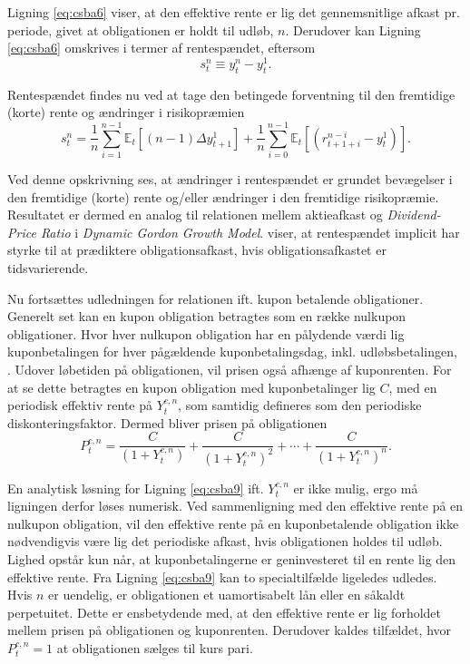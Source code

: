 \documentclass[
  a4paper,
  oneside]{memoir}
\begin{document}
Ligning \eqref{eq:csba6} viser, at den effektive rente er lig det gennemsnitlige afkast pr. periode, givet at obligationen er holdt til udløb, \(n\). Derudover kan Ligning \eqref{eq:csba6} omskrives i termer af rentespændet, eftersom
\begin{equation}
s_t^n\equiv y_t^n - y_t^1. \label{eq:csba7}
\end{equation}

Rentespændet findes nu ved at tage den betingede forventning til den fremtidige (korte) rente og ændringer i risikopræmien
\begin{equation}
s_t^n=\frac{1}{n} \sum_{i=1}^{n-1} \mathbb{E}_t\left[(n-1)\Delta y_{t+1}^1\right] + \frac{1}{n}\sum_{i=0}^{n-1}\mathbb{E}_t\left[(r_{t+1+i}^{n-i}-y_t^1)\right]. \label{eq:csba8}
\end{equation}

Ved denne opskrivning ses, at ændringer i rentespændet er grundet bevægelser i den fremtidige (korte) rente og/eller ændringer i den fremtidige risikopræmie. Resultatet er dermed en analog til relationen mellem aktieafkast og \emph{Dividend-Price Ratio} i \emph{Dynamic Gordon Growth Model}. \citep{Fama1987} viser, at rentespændet implicit har styrke til at prædiktere obligationsafkast, hvis obligationsafkastet er tidsvarierende.

Nu fortsættes udledningen for relationen ift. kupon betalende obligationer. Generelt set kan en kupon obligation betragtes som en række nulkupon obligationer. Hvor hver nulkupon obligation har en pålydende værdi lig kuponbetalingen for hver pågældende kuponbetalingsdag, inkl. udløbsbetalingen, \citep{Campbell1997}. Udover løbetiden på obligationen, vil prisen også afhænge af kuponrenten. For at se dette betragtes en kupon obligation med kuponbetalinger lig \(C\), med en periodisk effektiv rente på \(Y_t^{c,n}\), som samtidig defineres som den periodiske diskonteringsfaktor. Dermed bliver prisen på obligationen
\begin{equation}
P_t^{c,n}=\frac{C}{(1+Y_t^{c,n})}+\frac{C}{(1+Y_t^{c,n})^2}+\cdots+\frac{C}{(1+Y_t^{c,n})^n}.  \label{eq:csba9}
\end{equation}

En analytisk løsning for Ligning \eqref{eq:csba9} ift. \(Y_t^{c,n}\) er ikke mulig, ergo må ligningen derfor løses numerisk. Ved sammenligning med den effektive rente på en nulkupon obligation, vil den effektive rente på en kuponbetalende obligation ikke nødvendigvis være lig det periodiske afkast, hvis obligationen holdes til udløb. Lighed opstår kun når, at kuponbetalingerne er geninvesteret til en rente lig den effektive rente. Fra Ligning \eqref{eq:csba9} kan to specialtilfælde ligeledes udledes. Hvis \(n\) er uendelig, er obligationen et uamortisabelt lån eller en såkaldt perpetuitet. Dette er ensbetydende med, at den effektive rente er lig forholdet mellem prisen på obligationen og kuponrenten. Derudover kaldes tilfældet, hvor \(P_t^{c,n}=1\) at obligationen sælges til kurs pari.
\end{document}
